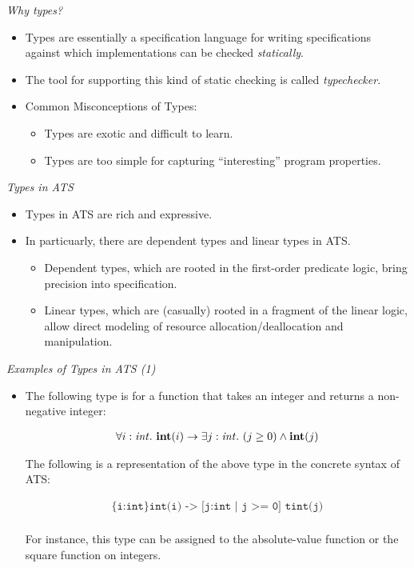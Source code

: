 \documentclass[pdf]{prosper}
\def\sint{{\it int}}
\def\tint{\mbox{\bf int}}
\def\Band{\land}
\def\timp{\rightarrow}
\begin{document}
\begin{slide}{\em Why types?}
\begin{itemize}

\item
Types are essentially a specification language for writing specifications
against which implementations can be checked {\em statically}.

\item
The tool for supporting this kind of static checking is called
{\em typechecker}.

\item
Common Misconceptions of Types:
\begin{itemize}
\item Types are exotic and difficult to learn.
\item Types are too simple for capturing ``interesting'' program properties.
\end{itemize}

\end{itemize}
\end{slide}
\begin{slide}{\em Types in ATS}
\begin{itemize}
\item Types in ATS are rich and expressive.
\item In particuarly, there are dependent types and linear types in ATS.
\begin{itemize}
\item Dependent types, which are rooted in the first-order
predicate logic, bring precision into specification.
\item Linear types, which are (casually) rooted in a fragment of the linear
logic, allow direct modeling of resource allocation/deallocation and manipulation.
\end{itemize}
\end{itemize}
\end{slide}
\begin{slide}{\em Examples of Types in ATS (1)}
\begin{itemize}
\item

The following type is for a function that takes an integer and returns
a non-negative integer:

$$\begin{array}{l}
\forall i:\sint.~\tint(i) \timp \exists j:\sint.~(j \geq 0)\Band\tint(j) \\
\end{array}$$

The following is a representation of the above type in the concrete syntax
of ATS:

$$\begin{array}{l}
\texttt{\{i:int\} int(i) -> [j:int | j >= 0] tint(j)} \\
\end{array}$$

For instance, this type can be assigned to the absolute-value function
or the square function on integers.

\end{itemize}
\end{slide}
\end{document}
